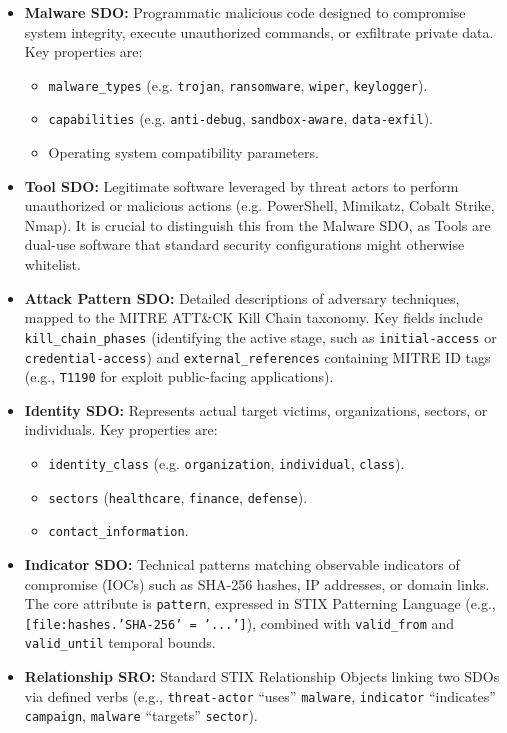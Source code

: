 \begin{itemize}
    \item \textbf{Malware SDO:} Programmatic malicious code designed to compromise system integrity, execute unauthorized commands, or exfiltrate private data. Key properties are:
    \begin{itemize}
        \item \texttt{malware\_types} (e.g. \texttt{trojan}, \texttt{ransomware}, \texttt{wiper}, \texttt{keylogger}).
        \item \texttt{capabilities} (e.g. \texttt{anti-debug}, \texttt{sandbox-aware}, \texttt{data-exfil}).
        \item Operating system compatibility parameters.
    \end{itemize}
    \item \textbf{Tool SDO:} Legitimate software leveraged by threat actors to perform unauthorized or malicious actions (e.g. PowerShell, Mimikatz, Cobalt Strike, Nmap). It is crucial to distinguish this from the Malware SDO, as Tools are dual-use software that standard security configurations might otherwise whitelist.
    \item \textbf{Attack Pattern SDO:} Detailed descriptions of adversary techniques, mapped to the MITRE ATT\&CK Kill Chain taxonomy. Key fields include \texttt{kill\_chain\_phases} (identifying the active stage, such as \texttt{initial-access} or \texttt{credential-access}) and \texttt{external\_references} containing MITRE ID tags (e.g., \texttt{T1190} for exploit public-facing applications).
    \item \textbf{Identity SDO:} Represents actual target victims, organizations, sectors, or individuals. Key properties are:
    \begin{itemize}
        \item \texttt{identity\_class} (e.g. \texttt{organization}, \texttt{individual}, \texttt{class}).
        \item \texttt{sectors} (\texttt{healthcare}, \texttt{finance}, \texttt{defense}).
        \item \texttt{contact\_information}.
    \end{itemize}
    \item \textbf{Indicator SDO:} Technical patterns matching observable indicators of compromise (IOCs) such as SHA-256 hashes, IP addresses, or domain links. The core attribute is \texttt{pattern}, expressed in STIX Patterning Language (e.g., \texttt{[file:hashes.'SHA-256' = '...']}), combined with \texttt{valid\_from} and \texttt{valid\_until} temporal bounds.
    \item \textbf{Relationship SRO:} Standard STIX Relationship Objects linking two SDOs via defined verbs (e.g., \texttt{threat-actor} ``uses'' \texttt{malware}, \texttt{indicator} ``indicates'' \texttt{campaign}, \texttt{malware} ``targets'' \texttt{sector}).
\end{itemize}

